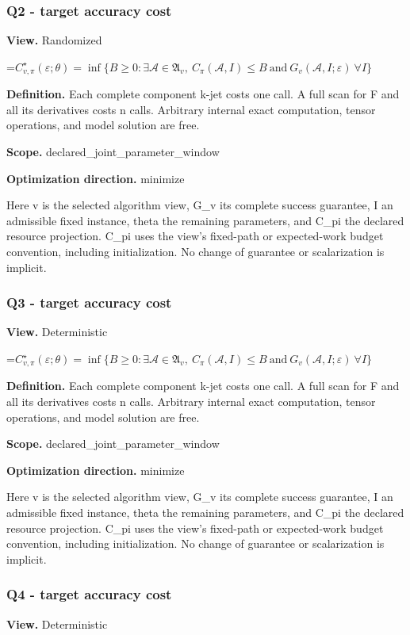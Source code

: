 \documentclass[10pt,a4paper]{article}
\newcommand{\AtlasMath}[1]{\par\begingroup\centering\setbox0=\hbox{$\displaystyle #1$}\ifdim\wd0>1.4\linewidth\typeout{ATLAS WIDE FORMULA: \the\wd0}\fi\ifdim\wd0>\linewidth\resizebox{\linewidth}{!}{\box0}\else\box0\fi\par\endgroup}
\begin{document}
\subsubsection{Q2 - target accuracy cost}
\textbf{View.} Randomized

\AtlasMath{C^\star_{v,\pi}(\varepsilon;\theta)=\inf\{B\ge0:\exists\mathcal A\in\mathfrak A_v,\ C_\pi(\mathcal A,I)\le B\ \text{and}\ G_v(\mathcal A,I;\varepsilon)\ \forall I\}}
\textbf{Definition.} Each complete component k-jet costs one call. A full scan for F and all its derivatives costs n calls. Arbitrary internal exact computation, tensor operations, and model solution are free.

\textbf{Scope.} declared\_joint\_parameter\_window

\textbf{Optimization direction.} minimize

Here v is the selected algorithm view, G\_v its complete success guarantee, I an admissible fixed instance, theta the remaining parameters, and C\_pi the declared resource projection. C\_pi uses the view's fixed-path or expected-work budget convention, including initialization. No change of guarantee or scalarization is implicit.

\subsubsection{Q3 - target accuracy cost}
\textbf{View.} Deterministic

\AtlasMath{C^\star_{v,\pi}(\varepsilon;\theta)=\inf\{B\ge0:\exists\mathcal A\in\mathfrak A_v,\ C_\pi(\mathcal A,I)\le B\ \text{and}\ G_v(\mathcal A,I;\varepsilon)\ \forall I\}}
\textbf{Definition.} Each complete component k-jet costs one call. A full scan for F and all its derivatives costs n calls. Arbitrary internal exact computation, tensor operations, and model solution are free.

\textbf{Scope.} declared\_joint\_parameter\_window

\textbf{Optimization direction.} minimize

Here v is the selected algorithm view, G\_v its complete success guarantee, I an admissible fixed instance, theta the remaining parameters, and C\_pi the declared resource projection. C\_pi uses the view's fixed-path or expected-work budget convention, including initialization. No change of guarantee or scalarization is implicit.

\subsubsection{Q4 - target accuracy cost}
\textbf{View.} Deterministic
\end{document}
